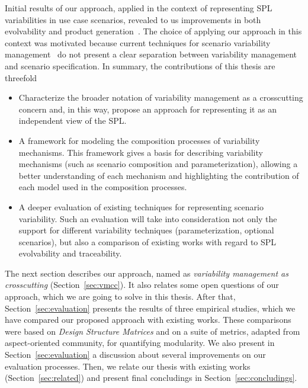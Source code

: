 \documentclass[times, 11pt,twocolumn]{article}
\begin{document}
Initial results of our approach, applied in the context of representing SPL
variabilities in use case scenarios, revealed to us improvements in both
evolvability and product generation~\cite{Bonifacio:2008aa}. The choice of applying our
approach in this context was motivated because current techniques for scenario variability
management~\cite{Eriksson:2005aa, Bertolino:2003aa} do not present a clear
separation between variability management and scenario specification.
In summary, the contributions of this thesis are threefold

\begin{itemize}
 \item Characterize the broader notation of variability management as
a crosscutting concern and, in this way, propose an approach for
representing it as an independent view of the SPL. 
 \item A framework for modeling the composition processes of 
variability mechanisms. This framework gives a basis for
describing variability mechanisms (such as scenario composition
and parameterization), allowing a better understanding of each mechanism and
highlighting the contribution of each model used in the composition processes.
 \item A deeper evaluation of existing techniques for representing scenario
 variability. Such an evaluation will take into consideration not only the
 support for different variability techniques (parameterization, optional
 scenarios), but also a comparison of existing works with regard to
 SPL evolvability and traceability.  
\end{itemize}

The next section describes our approach, named as \emph{variability management
as crosscutting} (Section~\ref{sec:vmcc}). It also relates some open questions
of our approach, which we are going to solve in this thesis. After that,
Section~\ref{sec:evaluation} presents the results of three empirical studies,
which we have compared our proposed approach with existing
works. These comparisons were based on \emph{Design Structure Matrices} and on a
suite of metrics, adapted from aspect-oriented community, for quantifying
modularity. We also present in Section~\ref{sec:evaluation} a discussion about several
improvements on our evaluation processes. Then, we relate our
thesis with existing works (Section~\ref{sec:related}) and present final concludings 
in Section~\ref{sec:concludings}.

\end{document}
